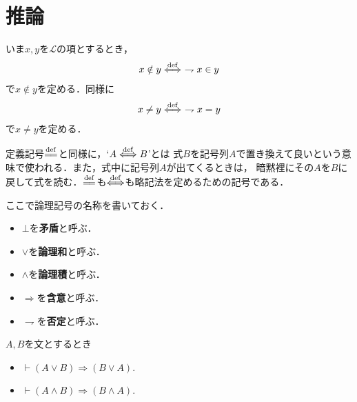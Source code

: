 \section{推論}
	いま$x,y$を$\mathcal{L}$の項とするとき，
	\begin{align}
		x \notin y \overset{\mathrm{def}}{\Longleftrightarrow}\ \rightharpoondown x \in y
	\end{align}
	で$x \notin y$を定める．同様に
	\begin{align}
		x \neq y \overset{\mathrm{def}}{\Longleftrightarrow}\ \rightharpoondown x = y
	\end{align}
	で$x \neq y$を定める．
	
	定義記号$\defeq$と同様に，`$A \overset{\mathrm{def}}{\Longleftrightarrow} B$'とは
	式$B$を記号列$A$で置き換えて良いという意味で使われる．また，式中に記号列$A$が出てくるときは，
	暗黙裡にその$A$を$B$に戻して式を読む．$\defeq$も$\overset{\mathrm{def}}{\Longleftrightarrow}$も略記法を定めるための記号である．
	
	ここで論理記号の名称を書いておく．
	\begin{itemize}
		\item $\bot$を{\bf 矛盾}と呼ぶ．
		\item $\vee$を{\bf 論理和}と呼ぶ．
		\item $\wedge$を{\bf 論理積}と呼ぶ．
		\item $\Longrightarrow$を{\bf 含意}と呼ぶ．
		\item $\rightharpoondown$を{\bf 否定}と呼ぶ．
	\end{itemize}
	
	\begin{screen}
		\begin{logicalthm}
		\label{logicalthm:commutative_law_of_disjunction_and_conjunction}
			$A,B$を文とするとき
			\begin{itemize}
				\item $\vdash (A \vee B) \Longrightarrow (B \vee A)$.
				\item $\vdash (A \wedge B) \Longrightarrow (B \wedge A)$.
			\end{itemize}
		\end{logicalthm}
	\end{screen}
	
